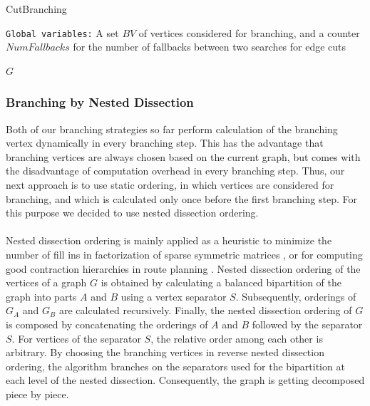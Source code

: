 \documentclass[12pt,a4paper,twoside]{scrartcl}
\numberwithin{equation}{section}
\let\oldnl\nl%
\newcommand{\nonl}{\renewcommand{\nl}{\let\nl\oldnl}}%
\begin{document}
\begin{algorithm}
	\caption{CutBranching}\label{alg:cut_strat}
	\DontPrintSemicolon
	\nonl\texttt{Global variables:} A set $BV$ of vertices considered for branching, and a counter $NumFallbacks$ for the number of fallbacks between two searches for edge cuts\\
	
	\U{$G$}
	
	
\end{algorithm}
\subsubsection{Branching by Nested Dissection}
Both of our branching strategies so far perform calculation of the branching vertex dynamically in every branching step. This has the advantage that branching vertices are always chosen based on the current graph, but comes with the disadvantage of computation overhead in every branching step. Thus, our next approach is to use static ordering, in which vertices are considered for branching, and which is calculated only once before the first branching step. For this purpose we decided to use nested dissection ordering.

\paragraph{}
Nested dissection ordering is mainly applied as a heuristic to minimize the number of fill ins in factorization of sparse symmetric matrices \cite{NDM}, or for computing good contraction hierarchies in route planning \cite{NDCH}. Nested dissection ordering of the vertices of a graph $G$ is obtained by calculating a balanced bipartition of the graph into parts $A$ and $B$ using a vertex separator $S$. Subsequently, orderings of $G_A$ and $G_B$ are calculated recursively. Finally, the nested dissection ordering of $G$ is composed by concatenating the orderings of $A$ and $B$ followed by the separator $S$. For vertices of the separator $S$, the relative order among each other is arbitrary. By choosing the branching vertices in reverse nested dissection ordering, the algorithm branches on the separators used for the bipartition at each level of the nested dissection. Consequently, the graph is getting decomposed piece by piece.
\end{document}
